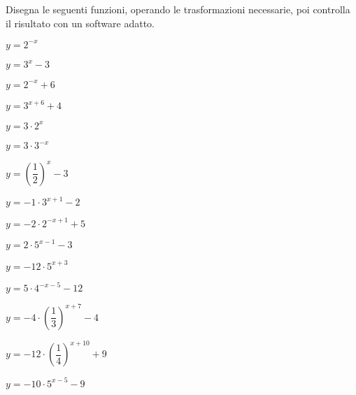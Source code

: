 \begin{esercizio}\label{ese:}
 Disegna le seguenti funzioni, operando le trasformazioni necessarie, poi 
controlla il risultato con un software adatto.
\begin{multicols}{3}
 \begin{enumeratea}
  \item  \(y= 2^{-x}\)
  \item  \(y= 3^{x} -3\)
  \item  \(y= 2^{-x} +6\)
  \item  \(y= 3^{x+6} +4\)
  \item  \(y= 3 \cdot 2^{x}\)
  \item  \(y= 3 \cdot 3^{-x}\)
  \item  \(y= \left(\dfrac{1}{2}\right)^{x} -3\)
  \item  \(y= -1 \cdot 3^{x+1} -2\)
  \item  \(y= -2 \cdot 2^{-x+1} +5\)
  \item  \(y= 2 \cdot 5^{x-1} -3\)
  \item  \(y=-12 \cdot 5^{x+3} \)
  \item  \(y=5 \cdot 4^{-x-5} -12\)
  \item  \(y=-4 \cdot \left(\dfrac{1}{3}\right)^{x+7} -4\)
  \item  \(y=-12 \cdot \left(\dfrac{1}{4}\right)^{x+10} +9\)
  \item  \(y=-10 \cdot 5^{x-5} -9\)
 \end{enumeratea}
 \end{multicols}
\end{esercizio}


